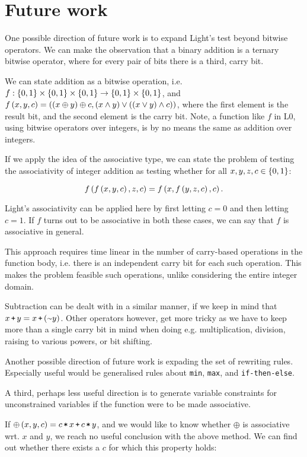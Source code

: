 \section{Future work}

One possible direction of future work is to expand Light's test beyond bitwise
operators. We can make the observation that a binary addition is a ternary
bitwise operator, where for every pair of bits there is a third, carry bit.

We can state addition as a bitwise operation, i.e. $f : \left\{{0,1}\right\} \times
\left\{{0,1}\right\} \times \left\{{0,1}\right\} \rightarrow \left\{{0,1}\right\} \times \left\{{0,1}\right\}$, and
$f\left({x,y,c}\right)=\left({\left({x \oplus y}\right) \oplus c, \left({x \wedge y}\right) \vee \left({ \left({ x \vee y}\right)
\wedge c}\right)}\right)$, where the first element is the result bit, and the second element
is the carry bit. Note, a function like $f$ in L0, using bitwise operators over
integers, is by no means the same as addition over integers.

If we apply the idea of the associative type, we can state the problem of
testing the associativity of integer addition as testing whether for all
$x,y,z,c\in \left\{{0,1}\right\}$:

\[f\left({f\left({x,y,c}\right), z,c}\right) = f\left({x, f\left({y,z,c}\right),c}\right).\]

Light's associativity can be applied here by first letting $c=0$ and then
letting $c=1$. If $f$ turns out to be associative in both these cases, we can
say that $f$ is associative in general.

This approach requires time linear in the number of carry-based operations in
the function body, i.e. there is an independent carry bit for each such
operation. This makes the problem feasible such operations, unlike considering
the entire integer domain.

Subtraction can be dealt with in a similar manner, if we keep in mind that
$x\lp y=x \lp(\lneg y)$. Other operators however, get more tricky as we have to
keep more than a single carry bit in mind when doing e.g. multiplication,
division, raising to various powers, or bit shifting.

Another possible direction of future work is expading the set of rewriting
rules. Especially useful would be generalised rules about \texttt{min},
\texttt{max}, and \texttt{if-then-else}.

A third, perhaps less useful direction is to generate variable constraints for
unconstrained variables if the function were to be made associative.

If $\oplus\p{x,y,c} = c\lt x \lp c \lt y$, and we would like to know
whether $\oplus$ is associative wrt. $x$ and $y$, we reach no useful conclusion
with the above method. We can find out whether there exists a $c$ for which
this property holds:

